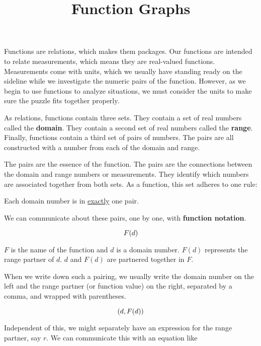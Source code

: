 \documentclass{ximera}
\title{Function Graphs}
\begin{document}
\begin{abstract}

\end{abstract}
\maketitle


Functions are relations, which makes them packages.  Our functions are intended to relate measurements, which means they are real-valued functions. Measurements come with units, which we usually have standing ready on the sideline while we investigate the numeric pairs of the function. However, as we begin to use functions to analyze situations, we must consider the units to make sure the puzzle fits together properly.



As relations, functions contain three sets.  They contain a set of real numbers called the \textbf{domain}.  They contain a second set of real numbers called the \textbf{range}. Finally, functions contain a third set of pairs of numbers.  The pairs are all constructed with a number from each of the domain and range.

The pairs are the essence of the function.  The pairs are the connections between the domain and range numbers or measurements.  They identify which numbers are associated together from both sets. As a function, this set adheres to one rule:


\begin{center}
Each domain number is in \underline{exactly} one pair.
\end{center}



We can communicate about these pairs, one by one, with \textbf{function notation}.

\[
\large{F(d)}
\]


$F$ is the name of the function and $d$ is a domain number.  $F(d)$ represents the range partner of $d$.  $d$ and $F(d)$ are partnered together in $F$.

When we write down such a pairing, we usually write the domain number on the left and the range partner (or function value) on the right, separated by a comma, and wrapped with parentheses.

\[ 
\large{(d, F(d))} 
\]

Independent of this, we might separately have an expression for the range partner, say $r$.  We can communicate this with an equation like
\end{document}
